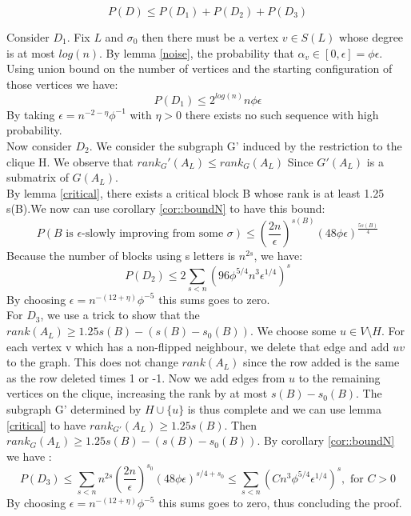 \begin{equation*}
P(D) \leq P(D_1) + P(D_2) + P(D_3)
\end{equation*}

Consider $D_1$. Fix $L$ and $\sigma_0$ then there must be a vertex $v \in S(L)$ whose degree is at most $log(n)$. By lemma  \ref{noise}, the probability that $\alpha_v \in [0, \epsilon] = \phi \epsilon$. Using union bound on the number of vertices and the starting configuration of those vertices we have:
\begin{equation}
P(D_1)  \leq 2^{log(n)}n \phi \epsilon
\end{equation}
By taking $\epsilon = n^{-2 - \eta} \phi^{-1}$ with $\eta > 0$ there exists no such sequence with high probability. \\

Now consider $D_2$. We consider the subgraph G' induced by the restriction to the clique H. We observe that $rank_G'(A_L) \leq rank_G(A_L)$ Since $G'(A_L)$ is a submatrix of $G(A_L)$.\\ 
By lemma \ref{critical}, there exists a critical block B whose rank is at least 1.25 s(B).We now can use corollary \ref{cor::boundN} to have this bound:
\begin{equation*}
P(B \text{ is }\epsilon \text {-slowly improving from some }\sigma) \leq (\frac{2n}{\epsilon})^{s(B)}(48\phi\epsilon)^{\frac{5s(B)}{4}}
\end{equation*}
Because the number of blocks using s letters is $n^{2s}$, we have:
\begin{equation*}
P(D_2) \leq 2 \sum_{s < n}(96\phi^{5/4}n^3\epsilon^{1/4})^s
\end{equation*}
By choosing $\epsilon = n^{-(12 + \eta)}\phi^{-5}$ this sums goes to zero.\\

For $D_3$, we use a trick to show that the $rank(A_L) \geq 1.25s(B) - (s(B) - s_0(B))$. We choose some $u \in V \setminus H$. For each vertex v which has a non-flipped neighbour, we delete that edge and add $uv$ to the graph. This does not change $rank(A_L)$ since the row added is the same as the row deleted times 1 or -1. Now we add edges from $u$ to the remaining vertices on the clique, increasing the rank by at most $s(B) - s_0(B)$. The subgraph G' determined by $H \cup \{u\}$ is thus complete and we can use  lemma \ref{critical} to have $rank_{G'}(A_L) \geq 1.25 s(B)$. Then $rank_G(A_L) \geq 1.25s(B) - (s(B) - s_0(B))$.
By corollary \ref{cor::boundN} we have :
\begin{equation*}
P(D_3) \leq  \sum_{s < n}n^{2s}(\dfrac{2n}{\epsilon})^{s_0}(48\phi\epsilon)^{s/4 + s_0} \leq \sum_{s < n}(Cn^{3}\phi^{5/4}\epsilon^{1/4})^{s}, \text{ for }C>0
\end{equation*}
By choosing $\epsilon = n^{-(12 + \eta)}\phi^{-5}$ this sums goes to zero, thus concluding the proof.